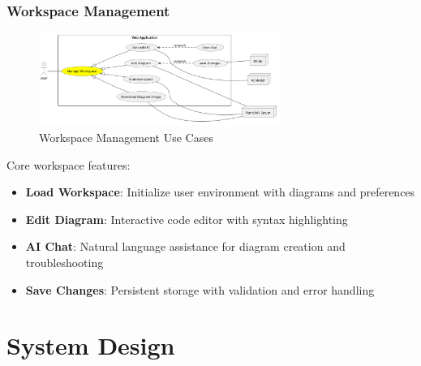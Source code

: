 \subsubsection{Workspace Management}
\begin{figure}[H]
\centering
\includegraphics[width=0.7\textwidth]{conception/SprintIV/use_case_diagrams/refined_use_case_feature_workspace_management.png}
\caption{Workspace Management Use Cases}
\end{figure}

Core workspace features:
\begin{itemize}
    \item \textbf{Load Workspace}: Initialize user environment with diagrams and preferences
    \item \textbf{Edit Diagram}: Interactive code editor with syntax highlighting
    \item \textbf{AI Chat}: Natural language assistance for diagram creation and troubleshooting
    \item \textbf{Save Changes}: Persistent storage with validation and error handling
\end{itemize}

\section{System Design}

